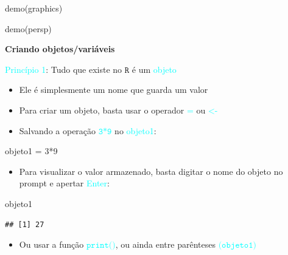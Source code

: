 \documentclass[
]{book}
\newenvironment{Shaded}{\begin{snugshade}}{\end{snugshade}}
\newcommand{\DecValTok}[1]{\textcolor[rgb]{0.00,0.00,0.81}{#1}}
\newcommand{\FunctionTok}[1]{\textcolor[rgb]{0.00,0.00,0.00}{#1}}
\newcommand{\NormalTok}[1]{#1}
\newcommand{\OtherTok}[1]{\textcolor[rgb]{0.56,0.35,0.01}{#1}}
\newcommand{\SpecialCharTok}[1]{\textcolor[rgb]{0.00,0.00,0.00}{#1}}
\providecommand{\tightlist}{%
  \setlength{\itemsep}{0pt}\setlength{\parskip}{0pt}}
\begin{document}
\begin{Shaded}
\begin{Highlighting}[]
\FunctionTok{demo}\NormalTok{(graphics)}
\end{Highlighting}
\end{Shaded}

\begin{Shaded}
\begin{Highlighting}[]
\FunctionTok{demo}\NormalTok{(persp)}
\end{Highlighting}
\end{Shaded}

\textbf{Criando objetos/variáveis}

\textcolor{cyan}{Princípio 1}: Tudo que existe no \(\texttt{R}\) é um \textcolor{cyan}{objeto}

\begin{itemize}
\item
  Ele é simplesmente um nome que guarda um valor
\item
  Para criar um objeto, basta usar o operador \textcolor{cyan}{$\texttt{=}$} ou \textcolor{cyan}{$\texttt{<-}$}
\item
  Salvando a operação \textcolor{cyan}{$\texttt{3*9}$} no \textcolor{cyan}{objeto1}:
\end{itemize}

\begin{Shaded}
\begin{Highlighting}[]
\NormalTok{objeto1 }\OtherTok{=} \DecValTok{3}\SpecialCharTok{*}\DecValTok{9}
\end{Highlighting}
\end{Shaded}

\begin{itemize}
\tightlist
\item
  Para visualizar o valor armazenado, basta digitar o nome do objeto no prompt e apertar \textcolor{cyan}{Enter}:
\end{itemize}

\begin{Shaded}
\begin{Highlighting}[]
\NormalTok{objeto1}
\end{Highlighting}
\end{Shaded}

\begin{verbatim}
## [1] 27
\end{verbatim}

\begin{itemize}
\tightlist
\item
  Ou usar a função \textcolor{cyan}{$\texttt{print()}$}, ou ainda entre parênteses \textcolor{cyan}{$\texttt{(objeto1)}$}
\end{itemize}
\end{document}
